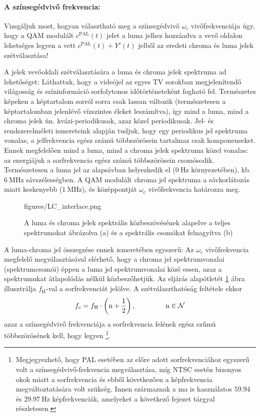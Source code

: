 \paragraph{A színsegédvivő frekvencia:}
Vizsgáljuk most, hogyan választható meg a színsegédvivő $\omega_c$ vivőfrekvenciája úgy, hogy a QAM modulált $c^{\mathrm{PAL}}(t)$ jelet a luma jelhez hozzáadva a vevő oldalon lehetséges legyen a vett $c^{\mathrm{PAL}}(t) + Y'(t)$ jelből az eredeti chroma és luma jelek szétválasztása!

A jelek vevőoldali szétválasztására a luma és chroma jelek spektruma ad lehetőséget:
Láthattuk, hogy a videójel az egyes TV sorokban megjelenítendő világosság és színinformáció sorfolytonos időtörténeteként fogható fel.
Természetes képeken a képtartalom sorról sorra csak lassan változik (természetesen a képtartalomban jelenlévő vízszintes éleket leszámítva), így mind a luma, mind a chroma jelek ún. kvázi-periodikusak, azaz közel periodikusak.
Jel- és rendszerelméleti ismereteink alapján tudjuk, hogy egy periodikus jel spektruma vonalas, a jelfrekvencia egész számú többszörösein tartalmaz csak komponenseket.
Ennek megfelelően mind a luma, mind a chroma jelek spektruma közel vonalas: az energiájuk a sorfrekvencia egész számú többszörösein csomósodik.
Természetesen a luma jel az alapsávban helyezkedik el ($0~\mathrm{Hz}$ környezetében), kb. $6~\mathrm{MHz}$ sávszélességben.
A QAM modulált chroma jel spektruma a sávkorlátozás miatt keskenyebb ($1~\mathrm{MHz}$), és középpontját $\omega_c$ vivőfrekvencia határozza meg.
\begin{figure}[]
	\centering
	\hspace{4mm}
	\begin{overpic}[width = 0.80\columnwidth ]{figures/LC_interlace.png}
	\end{overpic} \hfill
	\caption{A luma és chroma jelek spektrális közbeszövésének alapelve a teljes spektrumokat ábrázolva (a) és a spektrális csomókat felnagyítva (b)}
	\label{Fig:YC_interlace}
\end{figure}

A luma-chroma jel összegzése ennek ismeretében egyszerű: 
Az $\omega_c$ vivőfrekvencia megfelelő megválasztásával elérhető, hogy a chroma jel spektrumvonalai (spektrumcsomói) éppen a luma jel spektrumvonalai közé essen, azaz a spektrumukat átlapolódás nélkül közbeszőhetjük.
Az eljárás alapötletét \ref{Fig:YC_interlace} ábra illusztrálja $f_{\mathrm{H}}$-val a sorfrekvenciát jelölve.
A szétválaszthatóság feltétele ekkor 
\begin{equation}
f_c = f_{\mathrm{H}} \cdot \left( \mathrm{n} + \frac{1}{2}\right), \hspace{1.5cm} \mathrm{n} \in \mathcal{N} 
\end{equation}
azaz a színsegédvivő frekvenciája a sorfrekvencia felének egész szűmú többszörösének kell, hogy legyen \footnote{Megjegyezhető, hogy PAL esetében az előre adott sorfrekvenciához egyszerű volt a színsegédvivő-frekvencia megválasztása, míg NTSC esetén bizonyos okok miatt a sorfrekvencia és ebből következően a képfrekvencia megváltoztatására volt szükség. 
Innen származnak a ma is használatos $59.94$ és $29.97~\mathrm{Hz}$ képfrekvenciák, amelyeket a következő fejezet tárgyal részletesen.}.

